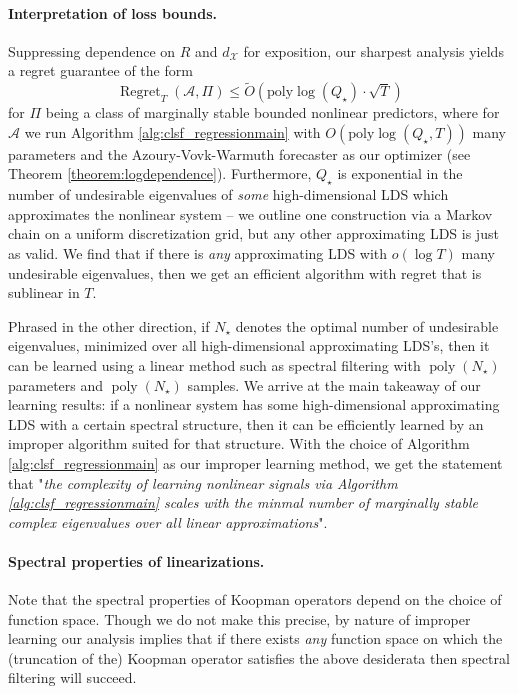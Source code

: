\documentclass[11pt]{article}
\def\mA{{\mathcal A}}
\def\mA{{\mathcal A}}
\numberwithin{equation}{section}
\begin{document}
\paragraph{Interpretation of loss bounds.} Suppressing dependence on $R$ and $d_\mathcal{X}$ for exposition, our sharpest analysis yields a regret guarantee of the form
$$\operatorname{Regret}_T(\mA, \Pi) \leq \widetilde{O}\left(\mathrm{poly} \log(Q_\star) \cdot \sqrt{T}\right)$$
for $\Pi$ being a class of marginally stable bounded nonlinear predictors,
where for $\mA$ we run Algorithm \ref{alg:clsf_regressionmain} with $O(\mathrm{poly} \log (Q_\star, T))$ many parameters and the Azoury-Vovk-Warmuth forecaster as our optimizer (see Theorem \ref{theorem:logdependence}). Furthermore, $Q_\star$ is exponential in the number of undesirable eigenvalues of \textit{some} high-dimensional LDS which approximates the nonlinear system -- we outline one construction via a Markov chain on a uniform discretization grid, but any other approximating LDS is just as valid. We find that if there is \textit{any} approximating LDS with $o(\log T)$ many undesirable eigenvalues, then we get an efficient algorithm with regret that is sublinear in $T$. 

Phrased in the other direction, if $N_\star$ denotes the optimal number of undesirable eigenvalues, minimized over all high-dimensional approximating LDS's, then it can be learned using a linear method such as spectral filtering with $\operatorname{poly}(N_\star)$ parameters and $\operatorname{poly}(N_\star)$ samples. We arrive at the main takeaway of our learning results: {if a nonlinear system has some high-dimensional approximating LDS with a certain spectral structure, then it can be efficiently learned by an improper algorithm suited for that structure}. 
With the choice of Algorithm \ref{alg:clsf_regressionmain} as our improper learning method, we get the statement that "\textit{the complexity of learning nonlinear signals via Algorithm \ref{alg:clsf_regressionmain} scales with the minmal number of marginally stable complex eigenvalues over all linear approximations}".

\paragraph{Spectral properties of linearizations.}
    Note that the spectral properties of Koopman operators depend on the choice of function space. Though we do not make this precise, by nature of improper learning our analysis implies that if there exists {\em any} function space on which the (truncation of the) Koopman operator satisfies the above desiderata then spectral filtering will succeed. 
    
\end{document}

